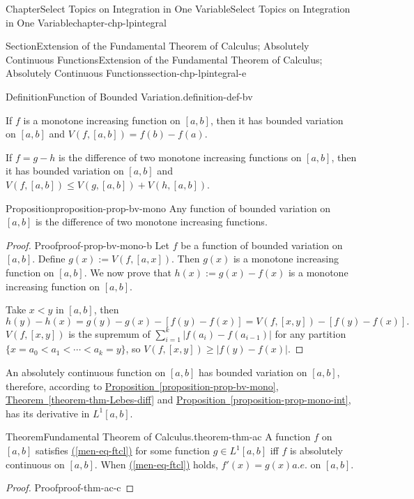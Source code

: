 \documentclass[oneside,10pt,]{book}
\newcommand{\xreffont}{\relax}
\numberwithin{equation}{section}
\begin{document}
\begin{chapterptx}{Chapter}{Select Topics on Integration in One Variable}{}{Select Topics on Integration in One Variable}{}{}{chapter-chp-lpintegral}
\begin{sectionptx}{Section}{Extension of the Fundamental Theorem of Calculus; Absolutely Continuous Functions}{}{Extension of the Fundamental Theorem of Calculus; Absolutely Continuous Functions}{}{}{section-chp-lpintegral-e}
\begin{definition}{Definition}{Function of Bounded Variation.}{definition-def-bv}
\end{definition}
If \(f\) is a monotone increasing function on \([a, b]\), then it has bounded variation on \([a, b]\) and \(V(f, [a, b])=f(b)-f(a)\).%
\par
If \(f=g-h\) is the difference of two monotone increasing functions on \([a, b]\), then it has bounded variation on \([a, b]\) and \(V(f, [a, b])\le V(g, [a, b])+V(h, [a, b])\).%
\begin{proposition}{Proposition}{}{}{proposition-prop-bv-mono}%
Any function of bounded variation on \([a, b]\) is the difference of  two monotone increasing functions.\end{proposition}
\begin{proof}{Proof}{}{proof-prop-bv-mono-b}
Let \(f\) be a function of bounded variation on \([a, b]\). Define \(g(x) :=V(f, [a, x])\). Then \(g(x)\) is a monotone increasing function on \([a, b]\). We now prove that \(h(x):=g(x)-f(x)\) is a monotone increasing function on \([a, b]\).%
\par
Take \(x < y\) in \([a, b]\), then%
\begin{equation*}
h(y)-h(x)=g(y)-g(x)-[f(y)-f(x)]=V(f, [x, y]) -[f(y)-f(x)].
\end{equation*}
\(V(f, [x, y])\) is the supremum of \(\sum_{i=1}^{k} |f(a_{i})-f(a_{i-1})|\) for any partition \(\{x= a_{0} < a_{1} < \cdots < a_{k}=y\}\), so \(V(f, [x, y])\ge |f(y)-f(x)|\).%
\end{proof}
An absolutely continuous function on \([a, b]\) has bounded variation on \([a, b]\), therefore, according to \hyperref[proposition-prop-bv-mono]{Proposition~{\xreffont\ref{proposition-prop-bv-mono}}}, \hyperref[theorem-thm-Lebes-diff]{Theorem~{\xreffont\ref{theorem-thm-Lebes-diff}}} and \hyperref[proposition-prop-mono-int]{Proposition~{\xreffont\ref{proposition-prop-mono-int}}}, has its derivative in \(L^{1}[a,  b]\).%
\begin{theorem}{Theorem}{Fundamental Theorem of Calculus.}{}{theorem-thm-ac}%
A function \(f\) on \([a, b]\) satisfies \hyperref[men-eq-ftcl]{({\xreffont\ref{men-eq-ftcl}})} for some function \(g\in L^{1}[a, b]\) iff \(f\) is absolutely continuous on \([a, b]\). When \hyperref[men-eq-ftcl]{({\xreffont\ref{men-eq-ftcl}})} holds, \(f'(x)=g(x)\)\(a.e.\) on \([a, b]\).\end{theorem}
\begin{proof}{Proof}{}{proof-thm-ac-c}

\end{proof}
\end{sectionptx}
\end{chapterptx}
\end{document}
